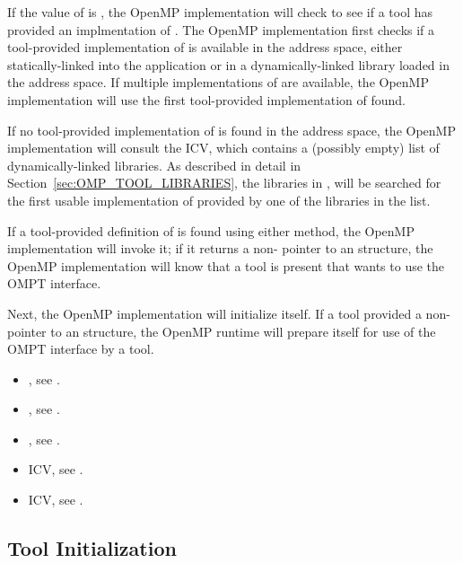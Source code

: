 If the value of  is , the OpenMP
implementation will check to see if a tool has provided an
implmentation of .  The OpenMP implementation first
checks if a tool-provided implementation of  is
available in the address space, either statically-linked into the
application or in a dynamically-linked library loaded in the address
space. If multiple implementations of  are available,
the OpenMP implementation will use the first tool-provided
implementation of  found.

If no tool-provided implementation of  is found in
the address space, the OpenMP implementation will consult the
 ICV, which contains a (possibly empty) list
of dynamically-linked libraries.  As described in detail in
Section~\ref{sec:OMP_TOOL_LIBRARIES}, the libraries in
, will be searched for the first usable
implementation of  provided by one of the libraries
in the list.

If a tool-provided definition of  is found using
either method, the OpenMP implementation will invoke it; if it returns
a non- pointer to an  structure, 
the OpenMP implementation will know
that a tool is present that wants to use the OMPT interface.

Next, the OpenMP implementation will initialize itself. If a tool
provided a non- pointer to an  structure,
the OpenMP runtime will prepare itself for use of the OMPT interface by a tool. 

\crossreferences
\begin{itemize}
\item {}, see .
\item {}, see .
\item {}, see .
\item {} ICV, see .
\item {} ICV, see .
\end{itemize}

\subsection{Tool Initialization}
\label{sec:tool-initialize}

